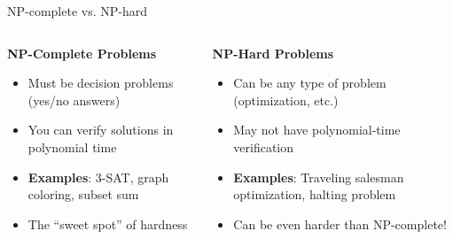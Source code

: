 \documentclass[aspectratio=169, lualatex, handout]{beamer}
\begin{document}
\begin{frame}{NP-complete vs. NP-hard}
	\begin{columns}[c]
		\begin{column}{0.5\textwidth}
			\textbf{NP-Complete Problems}
			\begin{itemize}[<+->]
				\item Must be decision problems (yes/no answers)
				\item You can verify solutions in polynomial time
				\item \textbf{Examples}: 3-SAT, graph coloring, subset sum
				\item The ``sweet spot'' of hardness
			\end{itemize}
		\end{column}
		\begin{column}{0.5\textwidth}
			\textbf{NP-Hard Problems}
			\begin{itemize}[<+->]
				\item Can be any type of problem (optimization, etc.)
				\item May not have polynomial-time verification
				\item \textbf{Examples}: Traveling salesman optimization, halting problem
				\item Can be even harder than NP-complete!
			\end{itemize}
		\end{column}
	\end{columns}
\end{frame}
\end{document}
